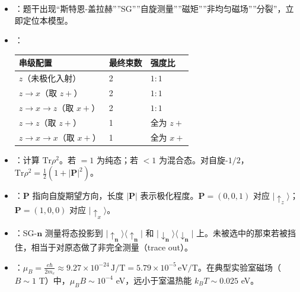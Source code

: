 \begin{tipbox}[快速识别与解题技巧]
\begin{itemize}
    \item {}：题干出现``斯特恩-盖拉赫''''SG''''自旋测量''''磁矩''''非均匀磁场''''分裂''，立即定位本模型。
    \item {}：
    \begin{center}
    \begin{tabular}{lll}
    \toprule
    \textbf{串级配置} & \textbf{最终束数} & \textbf{强度比} \\
    \midrule
    $z$（未极化入射） & 2 & $1:1$ \\
    $z\to x$（取 $z+$） & 2 & $1:1$ \\
    $z\to x\to z$（取 $x+$） & 2 & $1:1$ \\
    $z\to z$（取 $z+$） & 1 & 全为 $z+$ \\
    $z\to x\to x$（取 $x+$） & 1 & 全为 $x+$ \\
    \bottomrule
    \end{tabular}
    \end{center}
    \item {}：计算 $\text{Tr}\rho^2$。若 $=1$ 为纯态；若 $<1$ 为混合态。对自旋-$1/2$，$\text{Tr}\rho^2=\frac12(1+|\mathbf{P}|^2)$。
    \item {}：$\mathbf{P}$ 指向自旋期望方向，长度 $|\mathbf{P}|$ 表示极化程度。$\mathbf{P}=(0,0,1)$ 对应 $|\uparrow_z\rangle$；$\mathbf{P}=(1,0,0)$ 对应 $|\uparrow_x\rangle$。
    \item {}：SG-$\mathbf{n}$ 测量将态投影到 $|\uparrow_\mathbf{n}\rangle\langle\uparrow_\mathbf{n}|$ 和 $|\downarrow_\mathbf{n}\rangle\langle\downarrow_\mathbf{n}|$ 上。未被选中的那束若被挡住，相当于对原态做了非完全测量（trace out）。
    \item {}：$\mu_B=\frac{e\hbar}{2m_e}\approx9.27\times10^{-24}\,\text{J/T}=5.79\times10^{-5}\,\text{eV/T}$。在典型实验室磁场（$B\sim1$ T）中，$\mu_B B\sim10^{-4}$ eV，远小于室温热能 $k_BT\sim0.025$ eV。
\end{itemize}
\end{tipbox}

